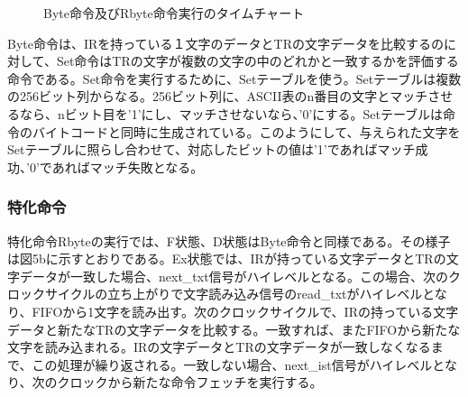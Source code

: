 \documentclass[submit]{ipsj}
\begin{document}
\begin{figure}[h]
       \caption{Byte命令及びRbyte命令実行のタイムチャート }
\end{figure}

Byte命令は、IRを持っている１文字のデータとTRの文字データを比較するのに対して、Set命令はTRの文字が複数の文字の中のどれかと一致するかを評価する命令である。Set命令を実行するために、Setテーブルを使う。Setテーブルは複数の256ビット列からなる。256ビット列に、ASCII表のn番目の文字とマッチさせるなら、nビット目を'1'にし、マッチさせないなら、'0'にする。Setテーブルは命令のバイトコードと同時に生成されている。このようにして、与えられた文字をSetテーブルに照らし合わせて、対応したビットの値は'1'であればマッチ成功、'0'であればマッチ失敗となる。\\

\subsubsection{特化命令}

特化命令Rbyteの実行では、F状態、D状態はByte命令と同様である。その様子は図5bに示すとおりである。Ex状態では、IRが持っている文字データとTRの文字データが一致した場合、next\_txt信号がハイレベルとなる。この場合、次のクロックサイクルの立ち上がりで文字読み込み信号のread\_txtがハイレベルとなり、FIFOから1文字を読み出す。次のクロックサイクルで、IRの持っている文字データと新たなTRの文字データを比較する。一致すれば、またFIFOから新たな文字を読み込まれる。IRの文字データとTRの文字データが一致しなくなるまで、この処理が繰り返される。一致しない場合、next\_ist信号がハイレベルとなり、次のクロックから新たな命令フェッチを実行する。
\end{document}
